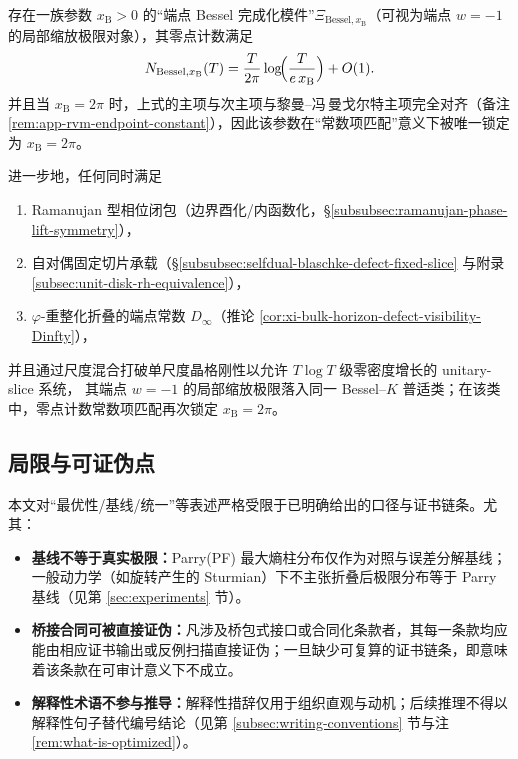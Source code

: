 \begin{conjecture}[端点 Bessel 完成化的普适性猜想：由零点计数常数项锁定 \texorpdfstring{$x_{\mathrm{B}}=2\pi$}{xB=2pi}]\label{conj:discussion-endpoint-bessel-universality}
存在一族参数 \(x_{\mathrm{B}}>0\) 的“端点 Bessel 完成化模件”\(\Xi_{\mathrm{Bessel},x_{\mathrm{B}}}\)（可视为端点 \(w=-1\) 的局部缩放极限对象），其零点计数满足
\[
N_{\mathrm{Bessel},x_{\mathrm{B}}}(T)
=\frac{T}{2\pi}\log\!\Bigl(\frac{T}{e\,x_{\mathrm{B}}}\Bigr)+O(1).
\]
并且当 \(x_{\mathrm{B}}=2\pi\) 时，上式的主项与次主项与黎曼--冯\,曼戈尔特主项完全对齐（备注 \ref{rem:app-rvm-endpoint-constant}），因此该参数在“常数项匹配”意义下被唯一锁定为 \(x_{\mathrm{B}}=2\pi\)。
\par
进一步地，任何同时满足
\begin{enumerate}
  \item[(i)] Ramanujan 型相位闭包（边界酉化/内函数化，\S\ref{subsubsec:ramanujan-phase-lift-symmetry}），
  \item[(ii)] 自对偶固定切片承载（\S\ref{subsubsec:selfdual-blaschke-defect-fixed-slice} 与附录 \ref{subsec:unit-disk-rh-equivalence}），
  \item[(iii)] \(\varphi\)-重整化折叠的端点常数 \(D_\infty\)（推论 \ref{cor:xi-bulk-horizon-defect-visibility-Dinfty}），
\end{enumerate}
并且通过尺度混合打破单尺度晶格刚性以允许 \(T\log T\) 级零密度增长的 unitary-slice 系统，
其端点 \(w=-1\) 的局部缩放极限落入同一 Bessel--\(K\) 普适类；在该类中，零点计数常数项匹配再次锁定 \(x_{\mathrm{B}}=2\pi\)。
\end{conjecture}








\subsection{局限与可证伪点}\label{subsec:limitations-falsifiable}
本文对“最优性/基线/统一”等表述严格受限于已明确给出的口径与证书链条。尤其：
\begin{itemize}
  \item \textbf{基线不等于真实极限：}Parry(PF) 最大熵柱分布仅作为对照与误差分解基线；一般动力学（如旋转产生的 Sturmian）下不主张折叠后极限分布等于 Parry 基线（见第 \ref{sec:experiments} 节）。
  \item \textbf{桥接合同可被直接证伪：}凡涉及桥包式接口或合同化条款者，其每一条款均应能由相应证书输出或反例扫描直接证伪；一旦缺少可复算的证书链条，即意味着该条款在可审计意义下不成立。
  \item \textbf{解释性术语不参与推导：}解释性措辞仅用于组织直观与动机；后续推理不得以解释性句子替代编号结论（见第 \ref{subsec:writing-conventions} 节与注 \ref{rem:what-is-optimized}）。
\end{itemize}

